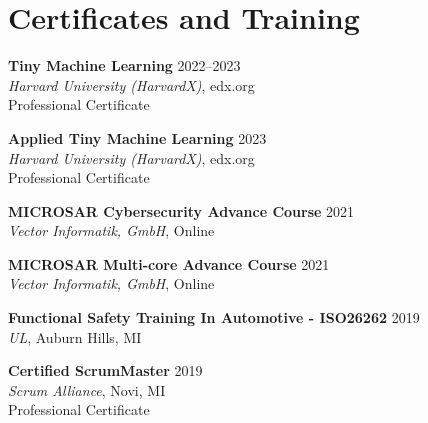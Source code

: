 \section*{Certificates and Training}

\noindent
\textbf{Tiny Machine Learning} \hfill 2022--2023 \\
\textit{Harvard University (HarvardX)}, edx.org \\
Professional Certificate

\vspace{0.5em}

\noindent
\textbf{Applied Tiny Machine Learning} \hfill 2023 \\
\textit{Harvard University (HarvardX)}, edx.org \\
Professional Certificate

\vspace{0.5em}

\noindent
\textbf{MICROSAR Cybersecurity Advance Course} \hfill 2021 \\
\textit{Vector Informatik, GmbH}, Online \\


\vspace{0.5em}

\noindent
\textbf{MICROSAR Multi-core Advance Course} \hfill 2021 \\
\textit{Vector Informatik, GmbH}, Online \\


\vspace{0.5em}

\noindent
\textbf{Functional Safety Training In Automotive - ISO26262} \hfill 2019 \\
\textit{UL}, Auburn Hills, MI \\


\vspace{0.5em}

\noindent
\textbf{Certified ScrumMaster} \hfill 2019 \\
\textit{Scrum Alliance}, Novi, MI \\
Professional Certificate